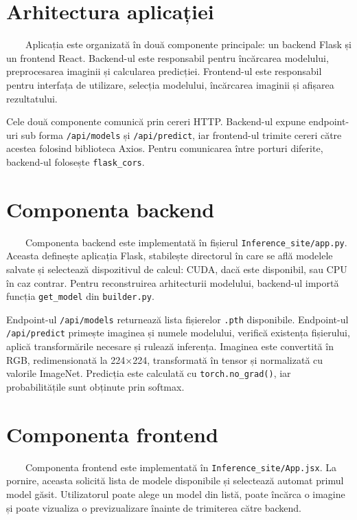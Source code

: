 \documentclass[12pt, a4paper, oneside, romanian]{teza-upb}
\begin{document}
\section{Arhitectura aplicației}

\ \ \ \ Aplicația este organizată în două componente principale: un backend Flask și un frontend React. Backend-ul este responsabil pentru încărcarea modelului, preprocesarea imaginii și calcularea predicției. Frontend-ul este responsabil pentru interfața de utilizare, selecția modelului, încărcarea imaginii și afișarea rezultatului.
\bigskip

Cele două componente comunică prin cereri HTTP. Backend-ul expune endpoint-uri sub forma \texttt{/api/models} și \texttt{/api/predict}, iar frontend-ul trimite cereri către acestea folosind biblioteca Axios. Pentru comunicarea între porturi diferite, backend-ul folosește \texttt{flask\_cors}.

\section{Componenta backend}

\ \ \ \ Componenta backend este implementată în fișierul \texttt{Inference\_site/app.py}. Aceasta definește aplicația Flask, stabilește directorul în care se află modelele salvate și selectează dispozitivul de calcul: CUDA, dacă este disponibil, sau CPU în caz contrar. Pentru reconstruirea arhitecturii modelului, backend-ul importă funcția \texttt{get\_model} din \texttt{builder.py}.
\bigskip

Endpoint-ul \texttt{/api/models} returnează lista fișierelor \texttt{.pth} disponibile. Endpoint-ul \texttt{/api/predict} primește imaginea și numele modelului, verifică existența fișierului, aplică transformările necesare și rulează inferența. Imaginea este convertită în RGB, redimensionată la 224$\times$224, transformată în tensor și normalizată cu valorile ImageNet. Predicția este calculată cu \texttt{torch.no\_grad()}, iar probabilitățile sunt obținute prin softmax.

\section{Componenta frontend}

\ \ \ \ Componenta frontend este implementată în \texttt{Inference\_site/App.jsx}. La pornire, aceasta solicită lista de modele disponibile și selectează automat primul model găsit. Utilizatorul poate alege un model din listă, poate încărca o imagine și poate vizualiza o previzualizare înainte de trimiterea către backend.
\bigskip
\end{document}
